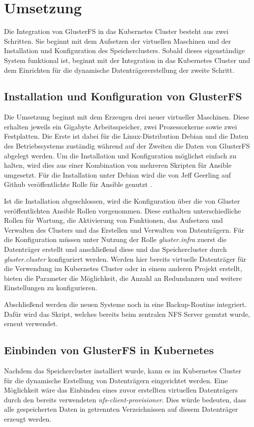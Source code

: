 \section{Umsetzung}
Die Integration von GlusterFS in das Kubernetes Cluster besteht aus zwei Schritten. Sie beginnt mit dem Aufsetzen der virtuellen Maschinen und der Installation und Konfiguration des Speicherclusters. Sobald dieses eigenständige System funktional ist, beginnt mit der Integration in das Kubernetes Cluster und dem Einrichten für die dynamische Datenträgererstellung der zweite Schritt.

\subsection{Installation und Konfiguration von GlusterFS}
Die Umsetzung beginnt mit dem Erzeugen drei neuer virtueller Maschinen. Diese erhalten jeweils ein Gigabyte Arbeitsspeicher, zwei Prozessorkerne sowie zwei Festplatten. Die Erste ist dabei für die Linux-Distribution Debian und die Daten des Betriebssystems zuständig während auf der Zweiten die Daten von GlusterFS abgelegt werden.
Um die Installation und Konfiguration möglichst einfach zu halten, wird dies aus einer Kombination von mehreren Skripten für Ansible umgesetzt. Für die Installation unter Debian wird die von Jeff Geerling auf Github veröffentlichte Rolle für Ansible genutzt \cite{gluster:ansibledebian}. \medskip

Ist die Installation abgeschlossen, wird die Konfiguration über die von Gluster veröffentlichten Ansible Rollen \cite{gluster:ansible} vorgenommen. Diese enthalten unterschiedliche Rollen für Wartung, die Aktivierung von Funktionen, das Aufsetzen und Verwalten des Clusters und das Erstellen und Verwalten von Datenträgern.
Für die Konfiguration müssen unter Nutzung der Rolle \textit{gluster.infra} zuerst die Datenträger erstellt und anschließend diese und das Speichercluster durch \textit{gluster.cluster} konfiguriert werden. Werden hier bereits virtuelle Datenträger für die Verwendung im Kubernetes Cluster oder in einem anderen Projekt erstellt, bieten die Parameter die Möglichkeit, die Anzahl an Redundanzen und weitere Einstellungen zu konfigurieren. \medskip

Abschließend werden die neuen Systeme noch in eine Backup-Routine integriert. Dafür wird das Skript, welches bereits beim zentralen NFS Server genutzt wurde, erneut verwendet. 


\subsection{Einbinden von GlusterFS in Kubernetes}
Nachdem das Speichercluster installiert wurde, kann es im Kubernetes Cluster für die dynamische Erstellung von Datenträgern eingerichtet werden. Eine Möglichkeit wäre das Einbinden eines zuvor erstellten virtuellen Datenträgers durch den bereits verwendeten \textit{nfs-client-provisioner}. Dies würde bedeuten, dass alle gespeicherten Daten in getrennten Verzeichnissen auf diesem Datenträger erzeugt werden. \medskip


